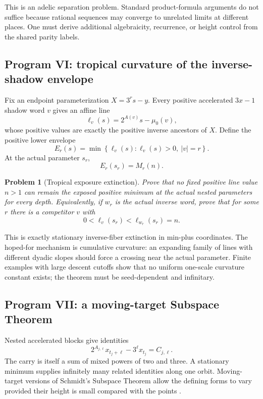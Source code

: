\documentclass[11pt,reqno]{amsart}
\numberwithin{equation}{section}
\newtheorem{problem}[theorem]{Problem}
\theoremstyle{definition}
\theoremstyle{remark}
\newcommand{\set}[1]{\left\{#1\right\}}
\begin{document}
This is an adelic separation problem.  Standard product-formula arguments do
not suffice because rational sequences may converge to unrelated limits at
different places.  One must derive additional algebraicity, recurrence, or
height control from the shared parity labels.

\subsection{Program VI: tropical curvature of the inverse-shadow envelope}

Fix an endpoint parameterization $X=3^rs-y$.  Every positive accelerated
$3x-1$ shadow word $v$ gives an affine line
\begin{equation}\label{eq:shadow-line}
\ell_v(s)=2^{A(v)}s-\mu_0(v),
\end{equation}
whose positive values are exactly the positive inverse ancestors of $X$.
Define the positive lower envelope
\begin{equation}\label{eq:lower-envelope}
E_r(s)=\min\set{\ell_v(s):\ell_v(s)>0,\ |v|=r}.
\end{equation}
At the actual parameter $s_r$,
\[
E_r(s_r)=M_r(n).
\]

\begin{problem}[Tropical exposure extinction]\label{prob:tropical-extinction}
Prove that no fixed positive line value $n>1$ can remain the exposed positive
minimum at the actual nested parameters for every depth.  Equivalently, if
$w_r$ is the actual inverse word, prove that for some $r$ there is a
competitor $v$ with
\begin{equation}\label{eq:tropical-target}
0<\ell_v(s_r)<\ell_{w_r}(s_r)=n.
\end{equation}
\end{problem}

This is exactly stationary inverse-fiber extinction in min-plus coordinates.
The hoped-for mechanism is cumulative curvature: an expanding family of
lines with different dyadic slopes should force a crossing near the actual
parameter.  Finite examples with large descent cutoffs show that no uniform
one-scale curvature constant exists; the theorem must be seed-dependent and
infinitary.

\subsection{Program VII: a moving-target Subspace Theorem}

Nested accelerated blocks give identities
\begin{equation}\label{eq:nested-trajectory-identity}
2^{A_{j,\ell}}x_{t_j+\ell}
-3^\ell x_{t_j}
=C_{j,\ell}.
\end{equation}
The carry is itself a sum of mixed powers of two and three.  A stationary
minimum supplies infinitely many related identities along one orbit.
Moving-target versions of Schmidt's Subspace Theorem allow the defining
forms to vary provided their height is small compared with the points
\cite{ZhaoLi2026}.
\end{document}
